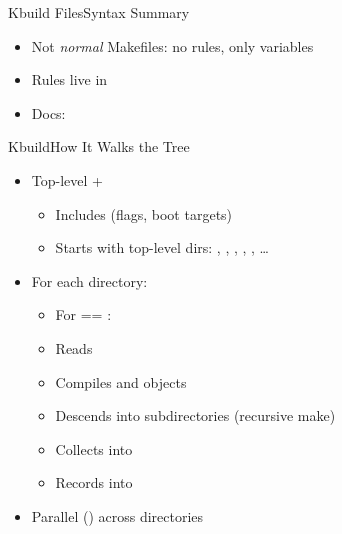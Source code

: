 \begin{frame}{Kbuild Files}{Syntax Summary}

  \begin{itemize}[<+->]
    \item Not \emph{normal} Makefiles: no rules, only variables
    \item Rules live in 
    \item Docs: 
  \end{itemize}

\end{frame}

\begin{frame}{Kbuild}{How It Walks the Tree}

  \begin{itemize}[<+->]
    \item Top-level  + 
      \begin{itemize}[<+->]
	\item Includes  (flags, boot targets)
	\item Starts with top-level dirs: , , ,
	  , , \dots
      \end{itemize}
    \item For each directory: 
      \begin{itemize}[<+->]
	\item For  == :
	\item Reads 
	\item Compiles  and  objects
	\item Descends into subdirectories (recursive make)
	\item Collects  into 
	\item Records  into 
      \end{itemize}
    \item Parallel () across directories
  \end{itemize}

\end{frame}

